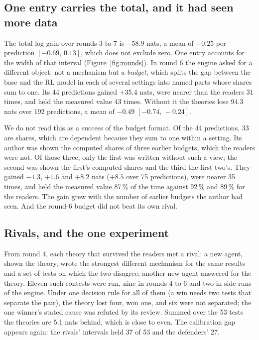 \documentclass[10pt]{article}
\newcommand{\ci}[2]{$[#1,\,#2]$}
\begin{document}
\subsection{One entry carries the total, and it had seen more data}\label{sec:account}

The total log gain over rounds 3 to 7 is $-58.9$ nats, a mean of $-0.25$ per prediction \ci{-0.69}{0.13}, which
does not exclude zero. One entry accounts for the width of that interval (Figure~\ref{fig:rounds}). In round 6 the
engine asked for a different object: not a mechanism but a \emph{budget}, which splits the gap between the base
and the RL model in each of several settings into named parts whose shares sum to one. Its 44 predictions gained
$+35.4$ nats, were nearer than the readers 31 times, and held the measured value 43 times. Without it the theories
lose 94.3 nats over 192 predictions, a mean of $-0.49$ \ci{-0.74}{-0.24}.

We do not read this as a success of the budget format. Of the 44 predictions, 33 are shares, which are dependent because
they sum to one within a setting. Its author was shown the computed shares of three earlier budgets, which the
readers were not. Of those three, only the first was written without such a view; the second was shown the first's
computed shares and the third the first two's. They gained $-1.3$, $+1.6$ and $+8.2$ nats ($+8.5$ over 75
predictions), were nearer 35 times, and held the measured value 87\,\% of the time against 92\,\% and 89\,\%
for the readers. The gain grew with the number of earlier budgets the author had seen. And the
round-6 budget did not beat its own rival.

\subsection{Rivals, and the one experiment}\label{sec:rival}

From round 4, each theory that survived the readers met a rival: a new agent, shown the theory, wrote the
strongest different mechanism for the same results and a set of tests on which the two disagree; another new agent
answered for the theory. Eleven such contests were run, nine in rounds 4 to 6 and two in side runs of the engine. Under one decision rule for all of them (a win needs two
tests that separate the pair), the theory lost four, won one, and six were not separated; the one winner's stated
cause was refuted by its review. Summed over the 53 tests the theories are 5.1 nats behind, which is close to
even. The calibration gap appears again: the rivals' intervals held 37 of 53 and the defenders' 27.
\end{document}
